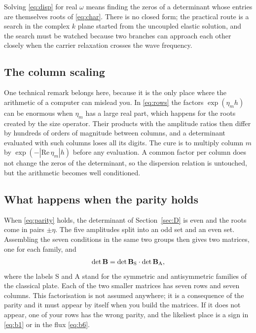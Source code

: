\documentclass[11pt,a4paper]{article}
\begin{document}
\noindent Solving \eqref{eq:disp} for real $\omega$ means finding the zeros of a determinant whose entries
are themselves roots of \eqref{eq:char}. There is no closed form; the practical route is a search in the
complex $k$ plane started from the uncoupled elastic solution, and the search must be watched because two
branches can approach each other closely when the carrier relaxation crosses the wave frequency.

\subsection{The column scaling}

One technical remark belongs here, because it is the only place where the arithmetic of a computer can
mislead you. In \eqref{eq:rows} the factors $\exp(\eta_mh)$ can be enormous when $\eta_m$ has a large real
part, which happens for the roots created by the size operator. Their products with the amplitude ratios
then differ by hundreds of orders of magnitude between columns, and a determinant evaluated with such
columns loses all its digits. The cure is to multiply column $m$ by $\exp(-|\mathrm{Re}\,\eta_m|h)$ before
any evaluation. A common factor per column does not change the zeros of the determinant, so the dispersion
relation is untouched, but the arithmetic becomes well conditioned.

\subsection{What happens when the parity holds}

When \eqref{eq:parity} holds, the determinant of Section~\ref{sec:D} is even and the roots come in pairs
$\pm\eta$. The five amplitudes split into an odd set and an even set. Assembling the seven conditions in the
same two groups then gives two matrices, one for each family, and
\begin{equation}\label{eq:factor}
\det\mathbf B=\det\mathbf B_{\rm S}\cdot\det\mathbf B_{\rm A},
\end{equation}
where the labels S and A stand for the symmetric and antisymmetric families of the classical plate. Each of
the two smaller matrices has seven rows and seven columns. This factorisation is not assumed anywhere; it is
a consequence of the parity and it must appear by itself when you build the matrices. If it does not appear,
one of your rows has the wrong parity, and the likeliest place is a sign in \eqref{eq:b1} or in the flux
\eqref{eq:b6}.
\end{document}
